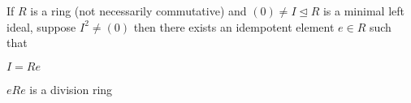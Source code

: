 \documentclass[10pt]{article}
\let\ideal=\trianglelefteq
\begin{document}


\bigskip

\begin{lemm*}

    If $R$ is a ring (not necessarily commutative) and $(0)\neq I\ideal R$ is a minimal left ideal, suppose $I^2\neq(0)$ then there exists an idempotent element $e\in R$ such that
    \benum
        \item $I=Re$
        \item $eRe$ is a division ring
    \eenum

\end{lemm*}
\end{document}
